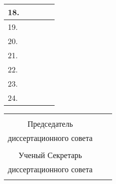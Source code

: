 \begin{longtable}{|l|p{5.1cm}|p{5cm}|l|l|}
	18. & \dcMemberFifteenFullFIO & \dcMemberFifteenRegaliaFull & &  \\	\hline
	19. & \dcMemberSixteenFullFIO & \dcMemberSixteenRegaliaFull &  &  \\	\hline
	20. & \dcMemberSeventeenFullFIO & \dcMemberSeventeenRegaliaFull & &  \\ \hline
	21. & \dcMemberEighteenFullFIO & \dcMemberEighteenRegaliaFull	 & &  \\ 	\hline
	22. & \dcMemberNineteenFullFIO & \dcMemberNineteenRegaliaFull & &  \\ 	\hline
	23. & \dcMemberTwentyFullFIO & \dcMemberTwentyRegaliaFull & &  \\ 	\hline
	24. & \dcMemberTwentyOneFullFIO & \dcMemberTwentyOneRegaliaFull & &  \\ 	\hline
	\hline
\end{longtable}





\begin{center}
	\begin{tabular}[c]{c m{4cm} l}
		      
		         				 &            &                                         \\
		  		Председатель     &            &                                         \\
	    диссертационного совета  & \hrulefill & \dcHeadFullFIO		                    \\
		     \dcHeadRegalia      &            &                                         \\
		      Ученый Секретарь   &            &                                   \\
		диссертационного совета  & \hrulefill & \dcSecretaryFullFIO						    \\
			\dcSecretaryRegalia  &  		  & 			   							\\

	\end{tabular}
\end{center}

\clearpage
